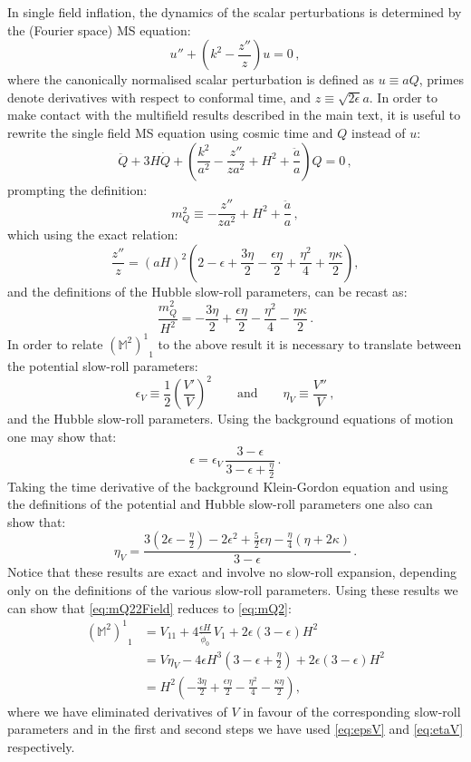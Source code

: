 \documentclass[a4paper,11pt]{article}
\def\be{\begin{equation}}
\def\ee{\end{equation}}
\begin{document}
In single field inflation, the dynamics of the scalar perturbations is determined by the (Fourier space) MS equation:
\be
u''+\left(k^2-\frac{z''}{z}\right) u=0\,,
\ee
where the canonically normalised scalar perturbation is defined as $u\equiv a Q$, primes denote derivatives with respect to conformal time, and $z\equiv \sqrt{2\epsilon} a$. In order to make contact with the multifield results described in the main text, it is useful to rewrite the single field MS equation using cosmic time and $Q$ instead of $u$: 
\be
\ddot{Q}+3H \dot{Q}+\left ( \frac{k^2}{a^2}-\frac{z''}{z a^2}+H^2+\frac{\ddot{a}}{a}\right )Q=0\,,
\ee
prompting the definition:
\be
m_Q^2\equiv -\frac{z''}{z a^2}+H^2+\frac{\ddot{a}}{a}\,,
\ee
which using the exact relation:
\be
\frac{z''}{z}=(aH)^2 \left(2-\epsilon+\frac{3 \eta}{2}-\frac{\epsilon \eta}{2} +\frac{\eta^2}{4}+\frac{\eta \kappa}{2}\right),
\ee
and the definitions of the Hubble slow-roll parameters, can be recast as:
\be
\frac{m_Q^2}{H^2}=-\frac{3 \eta}{2}+\frac{\epsilon \eta}{2}-\frac{\eta^2}{4}-\frac{\eta \kappa}{2}\,.
\label{eq:mQ2}
\ee
In order to relate ${(\mathbb{M}^2)^1}_1$ to the above result it is necessary to translate between the potential slow-roll parameters:
\be
\epsilon_V\equiv \frac{1}{2} \left(\frac{V'}{V}\right)^2 \qquad\text{and}\qquad \eta_V\equiv\frac{V''}{V}\,,
\ee
and the Hubble slow-roll parameters. Using the background equations of motion one may show that:
\be
\epsilon=\epsilon_V \,\frac{3-\epsilon}{3-\epsilon +\frac{\eta}{2}}\,.
\label{eq:epsV}
\ee
Taking the time derivative of the background Klein-Gordon equation and using the definitions of the potential and Hubble slow-roll parameters one also can show that:
\be
\eta_V=\frac{3(2 \epsilon-\frac{\eta}{2})-2\epsilon^2+\frac{5}{2} \epsilon \eta -\frac{\eta}{4}(\eta+2\kappa) }{3-\epsilon}\,.
\label{eq:etaV}
\ee
Notice that these results are exact and involve no slow-roll expansion, depending only on the definitions of the various slow-roll parameters. Using these results we can show that \eqref{eq:mQ22Field} reduces to \eqref{eq:mQ2}:
\be
\begin{split}
{\left(\mathbb{M}^2\right)^1}_1&= V_{11}+4\frac{\epsilon H }{\dot\phi_0}\,V_1+2\epsilon(3-\epsilon) H^2\\
&=V \eta_V-4 \epsilon H^3\left(3-\epsilon+\frac{\eta}{2}\right)+2\epsilon(3-\epsilon) H^2\\
&=H^2\left(-\frac{3 \eta}{2}+\frac{\epsilon \eta}{2}-\frac{\eta^2}{4}-\frac{\kappa \eta}{2}\right),
\end{split}
\ee
where we have eliminated derivatives of $V$ in favour of the corresponding slow-roll parameters and in the first and second steps we have used \eqref{eq:epsV} and \eqref{eq:etaV} respectively.
\end{document}
